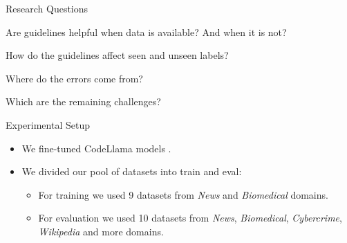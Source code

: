 \documentclass[
    11pt,
    notheorems,
    xcolor={dvipsnames},
    hyperref={
        pdfstartview=FitH, 
        pdftitle={Ikasketa-adibide urriko Informazio-Erauzketa}, 
        pdfauthor={Oscar Sainz Jimenez}, 
        citecolor=secondary, 
    }
]{beamer}
\begin{document}

\begin{frame}
    \begin{block}{Research Questions}
        \begin{itemize}
            {
                \item Are guidelines helpful when data is available? And when it is not?
            }
            {
                \item How do the guidelines affect seen and unseen labels?
            }
            {
                \item Where do the errors come from?
                \item Which are the remaining challenges?
            }
        \end{itemize}
    \end{block}
\end{frame}

\begin{frame}
    \begin{block}{Experimental Setup}
        \begin{itemize}
            \item We fine-tuned CodeLlama models .
            \item We divided our pool of datasets into train and eval:
                  \begin{itemize}
                      \item For training we used 9 datasets from \textit{News} and \textit{Biomedical} domains.
                      \item For evaluation we used 10 datasets from \textit{News}, \textit{Biomedical}, \textit{Cybercrime}, \textit{Wikipedia} and more domains.
                  \end{itemize}
        \end{itemize}
    \end{block}

\end{frame}
\end{document}
